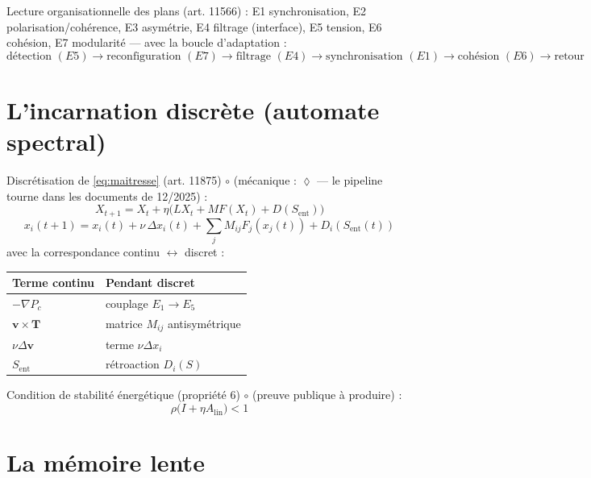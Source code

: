 \documentclass[11pt,a4paper]{article}
\newcommand{\SMOD}{\ensuremath{\lozenge}}
\newcommand{\SCONJ}{\ensuremath{\circ}}
\newcommand{\sent}{S_{\mathrm{ent}}}
\begin{document}
Lecture organisationnelle des plans (art. 11566) : E1 synchronisation, E2 polarisation/cohérence, E3 asymétrie, E4 filtrage (interface), E5 tension, E6 cohésion, E7 modularité --- avec la boucle d'adaptation :
\begin{equation}
\text{détection }(E5) \to \text{reconfiguration }(E7) \to \text{filtrage }(E4) \to \text{synchronisation }(E1) \to \text{cohésion }(E6) \to \text{retour}
\end{equation}

\section{L'incarnation discrète (automate spectral)}
\label{sec:discret}

Discrétisation de \eqref{eq:maitresse} (art. 11875) \SCONJ{} (mécanique : \SMOD{} --- le pipeline tourne dans les documents de 12/2025) :
\begin{equation}
X_{t+1} = X_t + \eta\Big(LX_t + MF(X_t) + D(\sent)\Big)
\label{eq:automate}
\end{equation}
\begin{equation}
x_i(t+1) = x_i(t) + \nu\,\Delta x_i(t) + \sum_{j} M_{ij} F_j(x_j(t)) + D_i(\sent(t))
\label{eq:automate2}
\end{equation}
avec la correspondance continu $\leftrightarrow$ discret :
\begin{center}
\begin{tabular}{@{}ll@{}}
\toprule
Terme continu & Pendant discret \\
\midrule
$-\nabla P_c$ & couplage $E_1 \to E_5$ \\
$\mathbf{v}\times\mathbf{T}$ & matrice $M_{ij}$ antisymétrique \\
$\nu\Delta\mathbf{v}$ & terme $\nu\Delta x_i$ \\
$\sent$ & rétroaction $D_i(S)$ \\
\bottomrule
\end{tabular}
\end{center}

Condition de stabilité énergétique (propriété 6) \SCONJ{} (preuve publique à produire) :
\begin{equation}
\rho\big(I + \eta A_{\mathrm{lin}}\big) < 1
\label{eq:stab}
\end{equation}

\section{La mémoire lente}
\label{sec:memoire}
\end{document}
